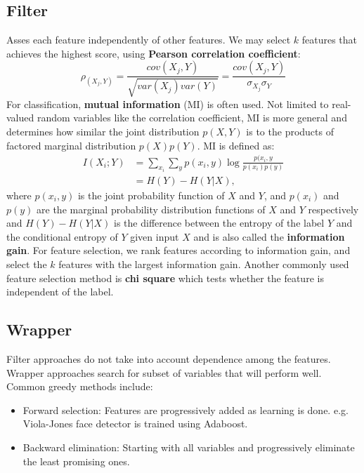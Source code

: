 \documentclass{article}
\begin{document}
   \subsection{Filter}
   Asses each feature independently of other features. We may select $k$ features that achieves the highest score, using \textbf{Pearson correlation coefficient}:
   \begin{equation}
   \rho_(X_j, Y) = \frac{cov(X_j, Y)}{\sqrt{var(X_j)var(Y)}} = \frac{cov(X_j, Y)}{\sigma_{X_j} \sigma_{Y}}
   \end{equation}
   For classification, \textbf{mutual information} (MI) is often used. Not limited to real-valued random variables like the correlation coefficient, MI is more general and determines how similar the joint distribution $p(X,Y)$ is to the products of factored marginal distribution $p(X)p(Y)$. MI is defined as:
   \begin{align}
   I(X_i;Y) &= \sum_{x_i} \sum_{y} p(x_i, y) \log \frac{p(x_i, y}{p(x_i)p(y)} \\
   			&= H(Y) - H(Y|X),
   \end{align}
   where $p(x_i,y)$ is the joint probability function of $X$ and $Y$, and $p(x_i)$ and $p(y)$ are the marginal probability distribution functions of $X$ and $Y$ respectively and $H(Y) - H(Y|X)$ is the difference between the entropy of the label $Y$ and the conditional entropy of $Y$ given input $X$ and is also called the \textbf{information gain}. For feature selection, we rank features according to information gain, and select the $k$ features with the largest information gain. Another commonly used feature selection method is \textbf{chi square} which tests whether the feature is independent of the label.
   
   \subsection{Wrapper}
   Filter approaches do not take into account dependence among the features. Wrapper approaches search for subset of variables that will perform well. Common greedy methods include:
   \begin{itemize}
   \item Forward selection: Features are progressively added as learning is done. e.g. Viola-Jones face detector is trained using Adaboost.
   \item Backward elimination: Starting with all variables and progressively eliminate the least promising ones.
   \end{itemize}
   
\end{document}
